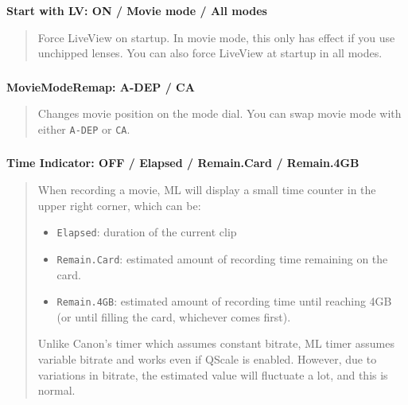 \documentclass[a4paper,english]{article}
\begin{document}
\textbf{Start with LV: ON / Movie mode / All modes}
%
\begin{quote}

Force LiveView on startup. In movie mode, this only has effect if you use unchipped lenses. You can also force LiveView at startup in all modes.

\end{quote}
\vspace{-10mm}\subsubsection*{}\label{change-movie-position}
\textbf{MovieModeRemap: A-DEP / CA}
%
\begin{quote}

Changes movie position on the mode dial. You can swap movie mode with either \texttt{A-DEP} or \texttt{CA}.

\end{quote}
\vspace{-10mm}\subsubsection*{}\label{time-remaining-display}
\textbf{Time Indicator: OFF / Elapsed / Remain.Card / Remain.4GB}
%
\begin{quote}

When recording a movie, ML will display a small time counter in the upper right corner,
which can be:
%
\begin{itemize}

\item \texttt{Elapsed}: duration of the current clip

\item \texttt{Remain.Card}: estimated amount of recording time remaining on the card.

\item \texttt{Remain.4GB}:  estimated amount of recording time until reaching 4GB (or until filling the card, whichever comes first).

\end{itemize}

Unlike Canon's timer which assumes constant bitrate, ML timer assumes variable bitrate and works even if QScale is enabled.
However, due to variations in bitrate, the estimated value will fluctuate a lot, and this is normal.

\end{quote}


\end{document}
